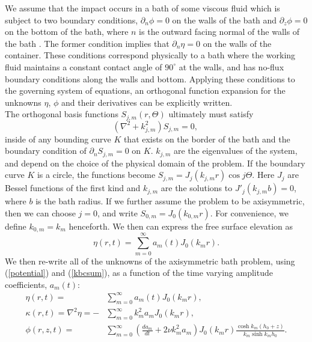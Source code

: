 \documentclass{jfm}
\begin{document}
\hspace*{1em} We assume that the impact occurs in a bath of some viscous fluid which is subject to two boundary conditions, $\partial_n \phi = 0$ on the walls of the bath and $\partial_z \phi =0 $ on the bottom of the bath, where $n$ is the outward facing normal of the walls of the bath \citep{benjamin1954stability}. The former condition implies that $\partial_n \eta =0$ on the walls of the container.  These conditions correspond physically to a bath where the working fluid maintains a constant contact angle of $90^{\circ}$ at the walls, and has no-flux boundary conditions along the walls and bottom. Applying these conditions to the governing system of equations, an orthogonal function expansion for the unknowns $\eta$, $\phi$ and their derivatives can be explicitly written. \\ \hspace*{1em} The orthogonal basis functions $S_{j,m}(r,\Theta)$ ultimately  must satisfy \begin{equation}
    (\nabla^2 + k_{j,m}^2) S_{j,m} = 0 \text{, }
\end{equation}
inside of any bounding curve $ K $ that exists on the border of the bath and the boundary condition of $\partial_n S_{j,m} = 0$ on $K$.  $k_{j,m}$ are the eigenvalues of the system, and depend on the choice of the physical domain of the problem. If the boundary curve $K$ is a circle, the functions become $S_{j,m} = J_j(k_{j,m} r) \cos{j \Theta}$.  Here $J_j$ are Bessel functions of the first kind and $k_{j,m}$ are the solutions to $J'_j(k_{j,m}b) = 0$, where $b$ is the bath radius. If we further assume the problem to be axisymmetric, then we can choose $j=0$, and write $S_{0,m} = J_0(k_{0,m} r)\text{.}$  For convenience, we define $k_{0,m}=k_m$ henceforth.  We then can express the free surface elevation as 
\begin{equation}
    \eta(r,t) = \sum_{m=0}^{\infty} a_m(t) J_0(k_{m} r) \text{.}
\end{equation}
We then re-write all of the unknowns of the axisymmetric bath problem, using (\ref{potential}) and (\ref{kbcsum}), as a function of the time varying amplitude coefficients, $a_m(t)$:
\begin{align} 
    \eta(r,t) = &\sum_{m=0}^{\infty} a_m(t) J_0(k_m r) \text{,} \label{bathmodelsum1}\\
    \kappa(r,t)=\nabla^2 \eta = -&\sum_{m=0}^{\infty} k_m^2 a_m J_0(k_m r) \text{,} \label{bathmodelsum2}\\ 
    \phi(r,z,t) = &\sum_{m=0}^{\infty} \left( \frac{d a_m}{dt} + 2 \nu k_m^2 a_m \right) J_0(k_m r) \frac{\cosh{k_m(h_0+z)}}{k_m\sinh{k_m h_0}} \text{.} \label{bathmodelsum3}
\end{align}
\end{document}
